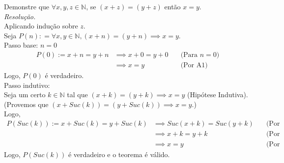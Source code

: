 Demonstre que $\forall x, y, z \in \mathbb{N}$, se $(x + z) = (y + z)$ então $x = y$. \\
\emph{Resolução.} \\
Aplicando indução sobre $z$. \\
Seja $P(n): =\forall x, y \in \mathbb{N}, (x + n) = (y + n) \implies x = y$. \\
Passo base: $n = 0$
\begin{align*}
    P(0):= x + n = y + n & \implies x + 0 = y + 0 & \quad \text{(Para $n = 0$)} \\ & \implies
    x = y                & \quad \text{(Por A1)}
\end{align*}
Logo, $P(0)$ é verdadeiro. \\
Passo indutivo: \\ Seja um certo $k \in \mathbb{N}$ tal que $(x + k) = (y + k) \implies x = y$ (Hipótese Indutiva). \\
(Provemos que $(x + Suc(k)) = (y + Suc(k)) \implies x = y$.) \\
Logo,
\begin{align*}
    P(Suc(k)) := x + Suc(k) = y + Suc(k) & \implies Suc(x + k) = Suc(y + k) & \quad \text{(Por A2)} \\ &\implies
    x + k = y + k                        & \quad \text{(Por S2)}                                    \\ & \implies
    x = y                                & \quad \text{(Por H.I)}
\end{align*}
Logo, $P(Suc(k))$ é verdadeiro e o teorema é válido.